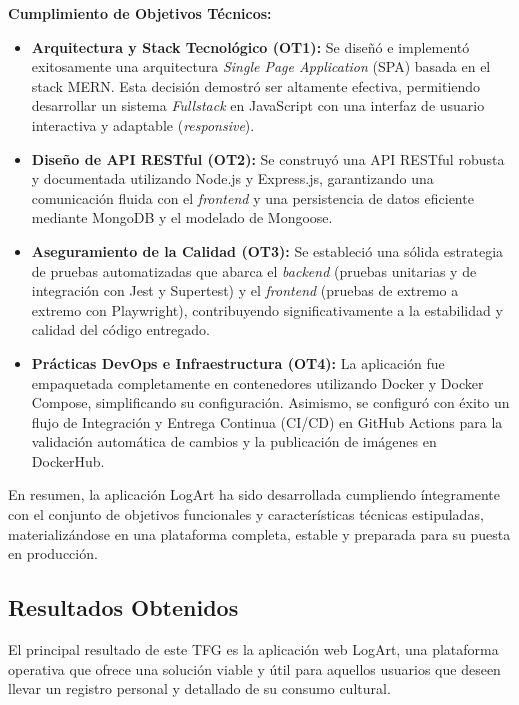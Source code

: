 \begin{itemize}
    \vspace{0.2cm}
    \textbf{Cumplimiento de Objetivos Técnicos:}
    \begin{itemize}
        \item \textbf{Arquitectura y Stack Tecnológico (OT1):} Se diseñó e implementó exitosamente una arquitectura \textit{Single Page Application} (SPA) basada en el stack MERN. Esta decisión demostró ser altamente efectiva, permitiendo desarrollar un sistema \textit{Fullstack} en JavaScript con una interfaz de usuario interactiva y adaptable (\textit{responsive}).
        \item \textbf{Diseño de API RESTful (OT2):} Se construyó una API RESTful robusta y documentada utilizando Node.js y Express.js, garantizando una comunicación fluida con el \textit{frontend} y una persistencia de datos eficiente mediante MongoDB y el modelado de Mongoose.
        \item \textbf{Aseguramiento de la Calidad (OT3):} Se estableció una sólida estrategia de pruebas automatizadas que abarca el \textit{backend} (pruebas unitarias y de integración con Jest y Supertest) y el \textit{frontend} (pruebas de extremo a extremo con Playwright), contribuyendo significativamente a la estabilidad y calidad del código entregado.
        \item \textbf{Prácticas DevOps e Infraestructura (OT4):} La aplicación fue empaquetada completamente en contenedores utilizando Docker y Docker Compose, simplificando su configuración. Asimismo, se configuró con éxito un flujo de Integración y Entrega Continua (CI/CD) en GitHub Actions para la validación automática de cambios y la publicación de imágenes en DockerHub.
    \end{itemize}
\end{itemize}

En resumen, la aplicación LogArt ha sido desarrollada cumpliendo íntegramente con el conjunto de objetivos funcionales y características técnicas estipuladas, materializándose en una plataforma completa, estable y preparada para su puesta en producción.

\subsection{Resultados Obtenidos}
\label{ssec:resultadosObtenidos}

El principal resultado de este TFG es la aplicación web LogArt, una plataforma operativa que ofrece una solución viable y útil para aquellos usuarios que deseen llevar un registro personal y detallado de su consumo cultural.

